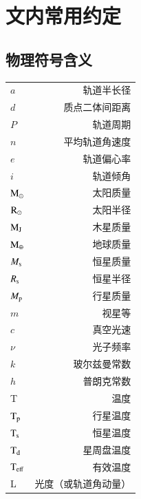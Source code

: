 
\chapter{文内常用约定} \label{apdx:nomenclature}
\section{物理符号含义} \label{apdx:symbol}
\begin{multicols}{2}
\begin{tabularx}{0.85\linewidth}{@{\extracolsep{\fill}}lr}
\centering
$a$      	     			&     轨道半长径 		\\
$d$      	     			&     质点二体间距离	 	\\
$P$      	     			&     轨道周期	 		\\
$n$      	     			&     平均轨道角速度	 	\\
$e$      	     			&     轨道偏心率 		\\
$i$          	     			&     轨道倾角 			\\
$\mathrm{M}_\odot$          		&     太阳质量   			\\
$\mathrm{R}_\odot$          		&     太阳半径   			\\
$\mathrm{M}_\mathrm{J}$          		&     木星质量   			\\
$\mathrm{M}_\oplus$          	&     地球质量   			\\
$M_\mathrm{s}$          		&     恒星质量   			\\
$R_\mathrm{s}$          		&     恒星半径   			\\
$M_\mathrm{p}$         	 	&     行星质量   			\\
$m$         	 			&     视星等   			\\
$c$         	 			&     真空光速   			\\
$\nu$         	 		&     光子频率   			\\
$k$         	 			&     玻尔兹曼常数   		\\
$h$         	 			&     普朗克常数   		\\
T		       	 		&      温度   			\\
$\mathrm{T}_\mathrm{p}$         	 	&      行星温度   		\\
$\mathrm{T}_\mathrm{s}$         	 	&      恒星温度   		\\
$\mathrm{T}_\mathrm{d}$         	 	&      星周盘温度   		\\
$\mathrm{T}_\mathrm{eff}$         	 	&      有效温度   		\\
L		         	 	&    光度（或轨道角动量）\\



\end{tabularx}
\end{multicols}
